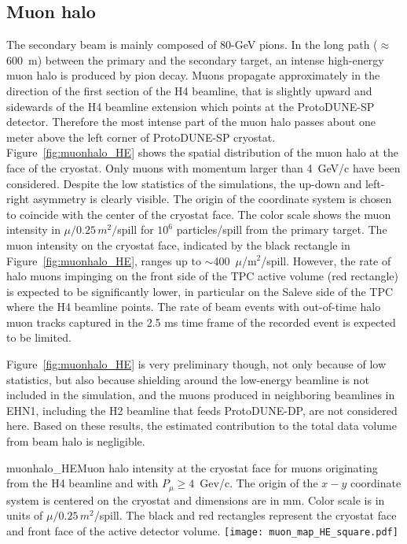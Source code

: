 \subsection{Muon halo}
The secondary beam is mainly composed of 80-GeV pions. In the long path ($\approx$ 600~m) between the primary and the secondary target,
 an intense high-energy muon halo is produced by pion decay. Muons propagate approximately in the direction of the first section of the H4 beamline,  that is slightly upward  and sidewards of the H4 beamline extension which points at the ProtoDUNE-SP detector.  
 Therefore the most intense part of the muon halo passes about one meter above the left corner of ProtoDUNE-SP cryostat. 
Figure~\ref{fig:muonhalo_HE} shows the spatial distribution of the muon halo at the face of the cryostat. Only muons with momentum larger than 4~GeV/c have been considered. Despite the low statistics of the simulations, the up-down and left-right asymmetry is clearly visible. 
The origin of the coordinate system is chosen to coincide with the center of the cryostat face. The color scale shows the muon intensity in  $\mu/0.25\,m^2/$spill for $10^6$ particles/spill from the primary target. The muon intensity on the cryostat face, indicated by the black rectangle in Figure~\ref{fig:muonhalo_HE}, ranges up to $\sim$400~$\mu$/m$^2$/spill. However, the rate of halo muons impinging on the front side of the TPC active volume (red rectangle) is expected to be significantly lower, in particular on the Saleve side of the TPC 
where the H4 beamline points. The rate of beam events with out-of-time halo muon tracks captured in the 2.5 ms time frame of the recorded event is expected to be limited.

Figure~\ref{fig:muonhalo_HE}  is very preliminary though, not only because of low statistics, but also because shielding around the low-energy beamline is not included in the simulation, and the muons produced in neighboring beamlines in EHN1, including the H2 beamline that feeds ProtoDUNE-DP, are not considered here. Based on these results, the estimated contribution to the total data volume from beam halo is negligible.
\begin{cdrfigure}{muonhalo_HE}{Muon halo intensity at the cryostat face for muons originating from the H4 beamline and with $P_\mu  \ge 4$~Gev/c. The origin of the $x-y$ coordinate system is centered on the cryostat and dimensions are in mm. Color scale is in units of $\mu/0.25\,m^2/$spill. The black and red rectangles represent the cryostat face and front face of the active detector volume.}
\texttt{[image: muon\_map\_HE\_square.pdf]}
\end{cdrfigure}
